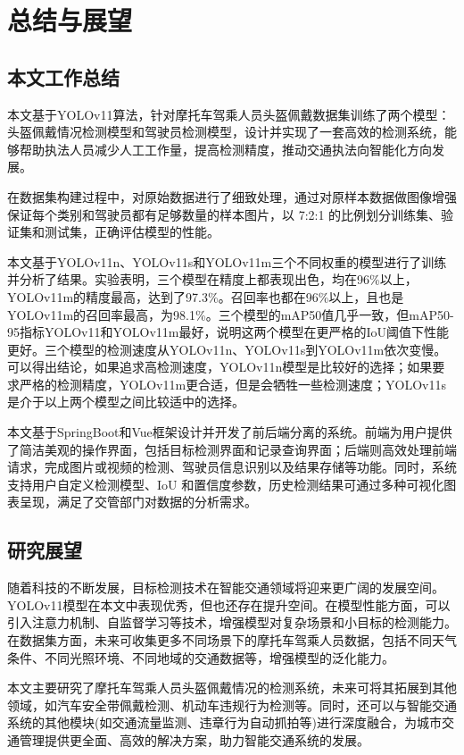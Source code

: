 
\chapter{总结与展望}

\section{本文工作总结}
本文基于YOLOv11算法，针对摩托车驾乘人员头盔佩戴数据集训练了两个模型：头盔佩戴情况检测模型和驾驶员检测模型，设计并实现了一套高效的检测系统，能够帮助执法人员减少人工工作量，提高检测精度，推动交通执法向智能化方向发展。

在数据集构建过程中，对原始数据进行了细致处理，通过对原样本数据做图像增强保证每个类别和驾驶员都有足够数量的样本图片，以 7:2:1 的比例划分训练集、验证集和测试集，正确评估模型的性能。

本文基于YOLOv11n、YOLOv11s和YOLOv11m三个不同权重的模型进行了训练并分析了结果。实验表明，三个模型在精度上都表现出色，均在96\%以上，YOLOv11m的精度最高，达到了97.3\%。召回率也都在96\%以上，且也是YOLOv11m的召回率最高，为98.1\%。三个模型的mAP50值几乎一致，但mAP50-95指标YOLOv11和YOLOv11m最好，说明这两个模型在更严格的IoU阈值下性能更好。三个模型的检测速度从YOLOv11n、YOLOv11s到YOLOv11m依次变慢。可以得出结论，如果追求高检测速度，YOLOv11n模型是比较好的选择；如果要求严格的检测精度，YOLOv11m更合适，但是会牺牲一些检测速度；YOLOv11s是介于以上两个模型之间比较适中的选择。


本文基于SpringBoot和Vue框架设计并开发了前后端分离的系统。前端为用户提供了简洁美观的操作界面，包括目标检测界面和记录查询界面；后端则高效处理前端请求，完成图片或视频的检测、驾驶员信息识别以及结果存储等功能。同时，系统支持用户自定义检测模型、IoU 和置信度参数，历史检测结果可通过多种可视化图表呈现，满足了交管部门对数据的分析需求。

\section{研究展望}
随着科技的不断发展，目标检测技术在智能交通领域将迎来更广阔的发展空间。YOLOv11模型在本文中表现优秀，但也还存在提升空间。在模型性能方面，可以引入注意力机制、自监督学习等技术，增强模型对复杂场景和小目标的检测能力。在数据集方面，未来可收集更多不同场景下的摩托车驾乘人员数据，包括不同天气条件、不同光照环境、不同地域的交通数据等，增强模型的泛化能力。

本文主要研究了摩托车驾乘人员头盔佩戴情况的检测系统，未来可将其拓展到其他领域，如汽车安全带佩戴检测、机动车违规行为检测等。同时，还可以与智能交通系统的其他模块(如交通流量监测、违章行为自动抓拍等)进行深度融合，为城市交通管理提供更全面、高效的解决方案，助力智能交通系统的发展。

